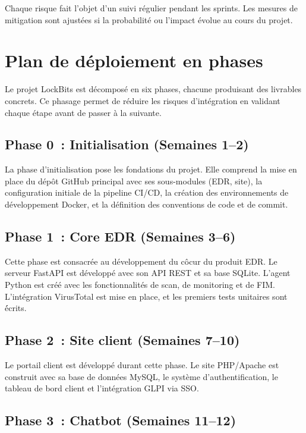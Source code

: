 Chaque risque fait l'objet d'un suivi r\'egulier pendant les sprints.
Les mesures de mitigation sont ajust\'ees si la probabilit\'e ou
l'impact \'evolue au cours du projet.

\section{Plan de d\'eploiement en phases}

Le projet LockBits est d\'ecompos\'e en six phases, chacune produisant
des livrables concrets. Ce phasage permet de r\'eduire les risques
d'int\'egration en validant chaque \'etape avant de passer \`a la
suivante.

\subsection{Phase 0~: Initialisation (Semaines 1--2)}

La phase d'initialisation pose les fondations du projet. Elle comprend
la mise en place du d\'ep\^ot GitHub principal avec ses
sous-modules (EDR, site), la configuration initiale de la pipeline
CI/CD, la cr\'eation des environnements de d\'eveloppement Docker, et
la d\'efinition des conventions de code et de commit.

\subsection{Phase 1~: Core EDR (Semaines 3--6)}

Cette phase est consacr\'ee au d\'eveloppement du c\^ocur du produit
EDR. Le serveur FastAPI est d\'evelopp\'e avec son API REST et sa base
SQLite. L'agent Python est cr\'e\'e avec les fonctionnalit\'es de scan,
de monitoring et de FIM. L'int\'egration VirusTotal est mise en place,
et les premiers tests unitaires sont \'écrits.

\subsection{Phase 2~: Site client (Semaines 7--10)}

Le portail client est d\'evelopp\'e durant cette phase. Le site
PHP/Apache est construit avec sa base de donn\'ees MySQL, le syst\`eme
d'authentification, le tableau de bord client et l'int\'egration GLPI
via SSO.

\subsection{Phase 3~: Chatbot (Semaines 11--12)}

